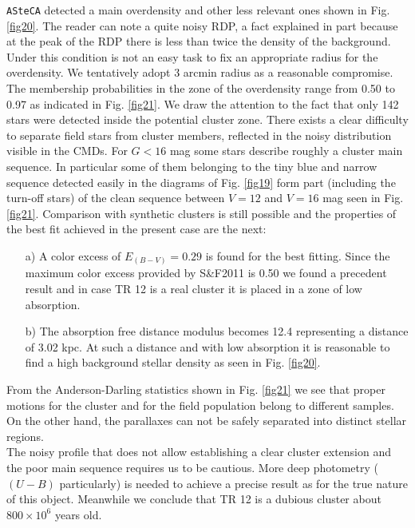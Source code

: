 \documentclass[draft]{aa}
\begin{document}
\texttt{ASteCA} detected a main overdensity and other less relevant ones shown
in Fig. \ref{fig20}. The reader can note a quite noisy RDP, a fact explained in
part because at the peak of the RDP there is less than twice the density of the
background. Under this condition is not an easy task to fix an appropriate
radius for the overdensity. We tentatively adopt 3 arcmin radius as a reasonable
compromise. The membership probabilities in the zone of the overdensity range
from 0.50 to 0.97 as indicated in Fig. \ref{fig21}. We draw the attention to
the fact that only 142 stars were detected inside the potential cluster zone.
%
There exists a clear difficulty to separate field stars from cluster
members, reflected in the noisy distribution visible in the CMDs. For $G<16$
mag some stars describe roughly a cluster main sequence.
In particular some of them belonging to the tiny blue and narrow
sequence detected easily in the diagrams of Fig. \ref{fig19} form part
(including the turn-off stars) of the clean sequence between $V = 12$ and $V =
16$ mag seen in Fig. \ref{fig21}. Comparison with synthetic clusters is still
possible and the properties of the best fit achieved in the present case are the
next:

\begin{itemize}
\item [a)] A color excess of $E_{(B-V)} = 0.29$ is found for the best fitting.
    Since the maximum color excess provided by S\&F2011 is 0.50 we found a
    precedent result and in case TR 12 is a real cluster it is placed in a
    zone of low absorption.
\item [b)] The absorption free distance modulus becomes 12.4 representing a
    distance of 3.02 kpc. At such a distance and with low absorption it is
    reasonable to find a high background stellar density as seen in Fig. 
    \ref{fig20}.
\end{itemize}

From the Anderson-Darling statistics shown in Fig. \ref{fig21} we see that
proper motions for the cluster and for the field population belong to different
samples. On the other hand, the parallaxes can not be safely separated into
distinct stellar regions.\\

The noisy profile that does not allow establishing a clear cluster extension
and the poor main sequence requires us to be cautious. More deep photometry
($(U-B)$ particularly) is needed to achieve a precise result as for the true
nature of this object. Meanwhile we conclude that TR 12 is a dubious cluster
about $800\times10^6$ years old.
\end{document}
